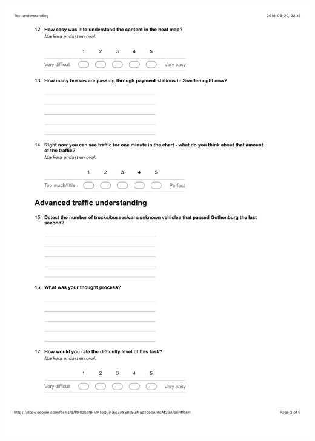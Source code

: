 \documentclass[12pt]{kththesis}
\begin{document}
\begin{appendices}
\includegraphics[width=1\textwidth]{TextUnderstanding3.pdf}
\newpage

\end{appendices}
\end{document}
